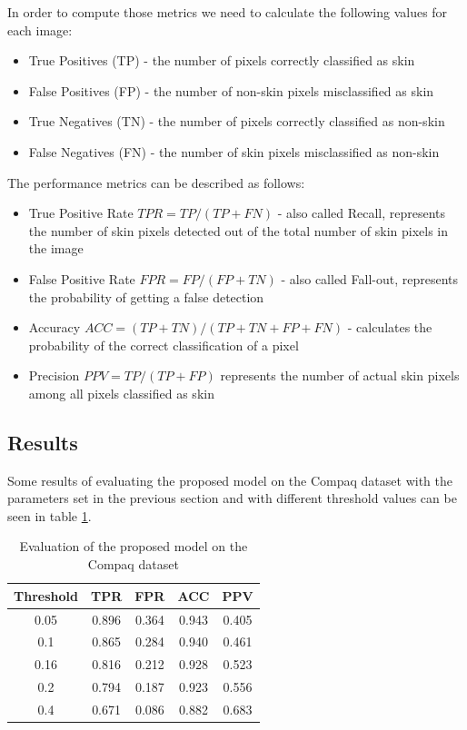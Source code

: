 \documentclass[12pt]{report}
\begin{document}
	In order to compute those metrics we need to calculate the following values for each image:
	\begin{itemize}
		\item True Positives (TP) - the number of pixels correctly classified as skin
		\item False Positives (FP) - the number of non-skin pixels misclassified as skin
		\item True Negatives (TN) - the number of pixels correctly classified as non-skin
		\item False Negatives (FN) - the number of skin pixels misclassified as non-skin
	\end{itemize}

	The performance metrics can be described as follows:
	\begin{itemize}
		\item True Positive Rate $TPR = TP / (TP + FN)$ - also called Recall, represents the number of skin pixels detected out of the total number of skin pixels in the image
		\item False Positive Rate $FPR = FP / (FP + TN)$ - also called Fall-out, represents the probability of getting a false detection
		\item Accuracy $ ACC = (TP + TN) / (TP + TN + FP + FN) $ - calculates the probability of the correct classification of a pixel 
		\item Precision $ PPV = TP / (TP + FP) $ represents the number of actual skin pixels among all pixels classified as skin
	\end{itemize}

	\subsection{Results}
	Some results of evaluating the proposed model on the Compaq dataset with the parameters set in the previous section and with different threshold values can be seen in table \ref{tab:results}.
	
	\begin{table}[h!]
		\begin{center}
			\caption{Evaluation of the proposed model on the Compaq dataset}
			\label{tab:results}
			\begin{tabular}{c|c|c|c|c}
				\textbf{Threshold} & \textbf{TPR} & \textbf{FPR} & \textbf{ACC} & \textbf{PPV} \\
				\hline
				0.05 & 0.896 & 0.364 & 0.943 & 0.405 \\
				0.1 & 0.865 & 0.284 & 0.940 & 0.461 \\
				0.16 & 0.816 & 0.212 & 0.928 & 0.523 \\
				0.2 & 0.794 & 0.187 & 0.923 & 0.556 \\
				0.4 & 0.671 & 0.086 & 0.882 & 0.683 \\
			\end{tabular}
		\end{center}
	\end{table}
	
\end{document}
